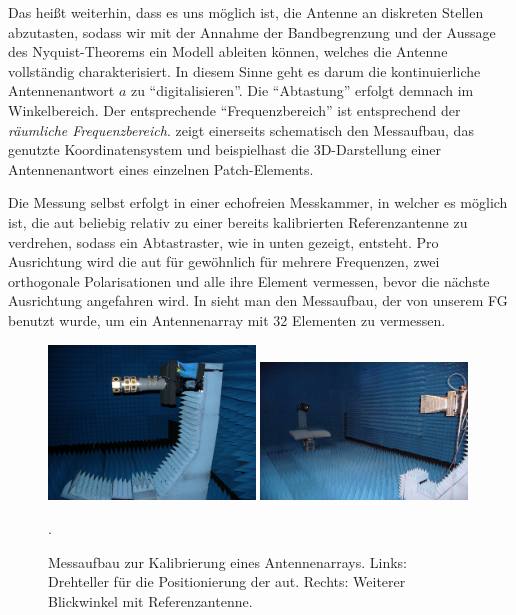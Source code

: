Das hei{\ss}t weiterhin, dass es uns m\"oglich ist, die Antenne an diskreten Stellen abzutasten, sodass wir mit der Annahme der Bandbegrenzung und der Aussage des Nyquist-Theorems ein Modell ableiten k\"onnen, welches die Antenne vollst\"andig charakterisiert. In diesem Sinne geht es darum die kontinuierliche Antennenantwort $a$ zu ``digitalisieren''. Die ``Abtastung'' erfolgt demnach im Winkelbereich. Der entsprechende ``Frequenzbereich'' ist entsprechend der \emph{r\"aumliche Frequenzbereich}.  zeigt einerseits schematisch den Messaufbau, das genutzte Koordinatensystem und beispielhast die 3D-Darstellung einer Antennenantwort eines einzelnen Patch-Elements.

Die Messung selbst erfolgt in einer echofreien Messkammer, in welcher es m\"oglich ist, die \gls{aut} beliebig relativ zu einer bereits kalibrierten Referenzantenne zu verdrehen, sodass ein Abtastraster, wie in  unten gezeigt, entsteht. Pro Ausrichtung wird die \gls{aut} f\"ur gew\"ohnlich f\"ur mehrere Frequenzen, zwei orthogonale Polarisationen und alle ihre Element vermessen, bevor die n\"achste Ausrichtung angefahren wird.
In  sieht man den Messaufbau, der von unserem FG benutzt wurde, um ein Antennenarray mit 32 Elementen zu vermessen.

\begin{figure}[t]
    \centering\includegraphics[width=0.49\textwidth]{img/eadf/anechoic1.png}
    \includegraphics[width=0.49\textwidth]{img/eadf/anechoic2.png}
    \caption{Messaufbau zur Kalibrierung eines Antennenarrays. Links: Drehteller f\"ur die Positionierung der \gls{aut}. Rechts: Weiterer Blickwinkel mit Referenzantenne.}\label{eadf_anechoic}.
\end{figure}

